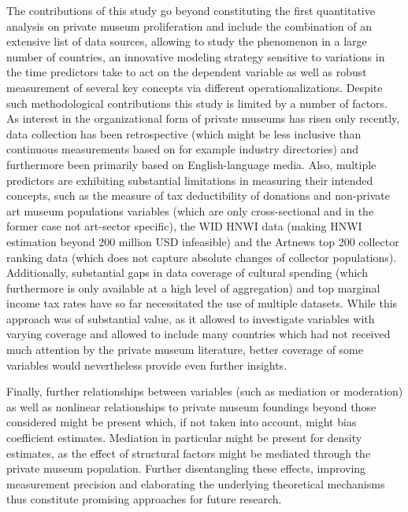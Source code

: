 \documentclass[11pt]{article}
\begin{document}
The contributions of this study go beyond constituting the first quantitative analysis on private museum proliferation and include the combination of an extensive list of data sources, allowing to study the phenomenon in a large number of countries, an innovative modeling strategy sensitive to variations in the time predictors take to act on the dependent variable as well as robust measurement of several key concepts via different operationalizations.
Despite such methodological contributions this study is limited by a number of factors. 
As interest in the organizational form of private museums has risen only recently, data collection has been retrospective (which might be less inclusive than continuous measurements based on for example industry directories) and furthermore been primarily based on English-language media.
Also, multiple predictors are exhibiting substantial limitations in measuring their intended concepts, such as the measure of tax deductibility of donations and non-private art museum populations variables (which are only cross-sectional and in the former case not art-sector specific), the WID HNWI data (making HNWI estimation beyond 200 million USD infeasible) and the Artnews top 200 collector ranking data (which does not capture absolute changes of collector populations).
Additionally, substantial gaps in data coverage of cultural spending (which furthermore is only available at a high level of aggregation) and top marginal income tax rates have so far necessitated the use of multiple datasets.
While this approach was of substantial value, as it allowed to investigate variables with varying coverage and  allowed to include many countries which had not received much attention by the private museum literature, better coverage of some variables would nevertheless provide even further insights.


Finally, further relationships between variables (such as mediation or moderation) as well as nonlinear relationships to private museum foundings beyond those considered might be present which, if not taken into account, might bias coefficient estimates.
Mediation in particular might be present for density estimates, as the effect of structural factors might be mediated through the private museum population.
Further disentangling these effects, improving measurement precision and elaborating the underlying theoretical mechanisms thus constitute promising approaches for future research. 

\begin{sloppypar}
\printbibliography[segment=\therefsegment]
\end{sloppypar}
\end{document}
